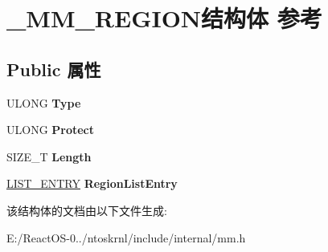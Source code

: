 \hypertarget{struct___m_m___r_e_g_i_o_n}{}\section{\+\_\+\+M\+M\+\_\+\+R\+E\+G\+I\+O\+N结构体 参考}
\label{struct___m_m___r_e_g_i_o_n}
\subsection*{Public 属性}
\begin{DoxyCompactItemize}
\item 
\mbox{\label{struct___m_m___r_e_g_i_o_n_a587c6f8dc6919f5b476135f2d7395c86}} 
U\+L\+O\+NG {\bfseries Type}
\item 
\mbox{\label{struct___m_m___r_e_g_i_o_n_ad3f3a207026d7fc27d132f544d89550e}} 
U\+L\+O\+NG {\bfseries Protect}
\item 
\mbox{\label{struct___m_m___r_e_g_i_o_n_a87b6a73fd20ec7028b4e8559a6c98242}} 
S\+I\+Z\+E\+\_\+T {\bfseries Length}
\item 
\mbox{\label{struct___m_m___r_e_g_i_o_n_a580e8028edbe89cc2452a34534964f33}} 
\hyperlink{struct___l_i_s_t___e_n_t_r_y}{L\+I\+S\+T\+\_\+\+E\+N\+T\+RY} {\bfseries Region\+List\+Entry}
\end{DoxyCompactItemize}


该结构体的文档由以下文件生成\+:\begin{DoxyCompactItemize}
\item 
E\+:/\+React\+O\+S-\/0../ntoskrnl/include/internal/mm.\+h\end{DoxyCompactItemize}
